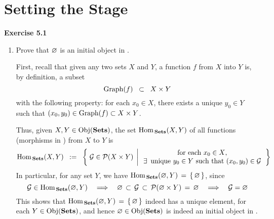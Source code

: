 

\section{Setting the Stage}
\setcounter{theorem}{0}
\setcounter{equation}{0}


\renewcommand{\theenumi}{\roman{enumi}}
\renewcommand{\labelenumi}{\textnormal{(\theenumi)}$\;\;$}


\noindent
\textbf{Exercise 5.1}
\begin{enumerate}
\item
	Prove that $\varnothing$ is an initial object in \Sets.
	
	\proof
	First, recall that given any two sets $X$ and $Y$, a function $f$ from $X$ into $Y$ is,
	by definition, a subset
	\begin{equation*}
	\textnormal{Graph}(f) \;\; \subset \;\; X \times Y
	\end{equation*}
	with the following property:
	for each $x_{0} \in X$, there {\color{red}exists} a {\color{red}unique} $y_{0} \in Y$ such that
	$(x_{0},y_{0}) \in \textnormal{Graph}(f) \subset X \times Y$.
	
	Thus, given $X, Y \in \textnormal{Obj}(\textbf{Sets})$, the set $\textnormal{Hom}_{\,\textbf{Sets}}(X,Y)$ of all
	functions (morphisms in \Sets) from $X$ to $Y$ is
	\begin{equation*}
	\textnormal{Hom}_{\,\textbf{Sets}}(X,Y)
	\;\; := \;\;
		\left\{\;
			\mathcal{G} \in \mathcal{P}(X \times Y)
			\;\left\vert\,
			\begin{array}{c}
				\textnormal{for each $x_{0} \in X$,}
				\\
				\textnormal{$\exists$\, unique $y_{0} \in Y$ such that $(x_{0},y_{0}) \in \mathcal{G}$}
			\end{array}
			\right.
		\right\}
	\end{equation*}
	In particular, for any set $Y$, we have $\textnormal{Hom}_{\,\textbf{Sets}}(\varnothing,Y) \,=\, \left\{\,\varnothing\,\right\}$,
	since
	\begin{equation*}
	\mathcal{G} \in \textnormal{Hom}_{\,\textbf{Sets}}(\varnothing,Y)
	\quad\Longrightarrow\quad
		\varnothing \,\subset\, \mathcal{G} \,\subset\, \mathcal{P}(\varnothing \times Y) \,=\, \varnothing
	\quad\Longrightarrow\quad
		\mathcal{G} = \varnothing
	\end{equation*}
	This shows that $\textnormal{Hom}_{\,\textbf{Sets}}(\varnothing,Y) \,=\, \left\{\,\varnothing\,\right\}$ indeed
	has a unique element, for each $Y \in \textnormal{Obj}(\textbf{Sets})$, and hence $\varnothing \in \textnormal{Obj}(\textbf{Sets})$ is indeed
	an initial object in \Sets.
	
\end{enumerate}


\renewcommand{\theenumi}{\roman{enumi}}
\renewcommand{\labelenumi}{\textnormal{(\theenumi)}$\;\;$}

